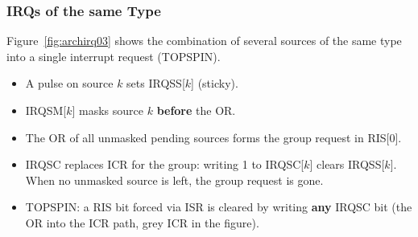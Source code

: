 \subsubsection{IRQs of the same Type}
\label{subsubsec:archirqsame}

Figure~\ref{fig:archirq03} shows the combination of several sources of the
same type into a single interrupt request (TOPSPIN).
\begin{itemize}
  \item A pulse on source $k$ sets IRQSS[$k$] (sticky).
  \item IRQSM[$k$] masks source $k$ \textbf{before} the OR.
  \item The OR of all unmasked pending sources forms the group request in RIS[0].
  \item IRQSC replaces ICR for the group: writing 1 to IRQSC[$k$] clears IRQSS[$k$].
    When no unmasked source is left, the group request is gone.
  \item TOPSPIN: a RIS bit forced via ISR is cleared by writing \textbf{any}
    IRQSC bit (the OR into the ICR path, grey ICR in the figure).
\end{itemize}

